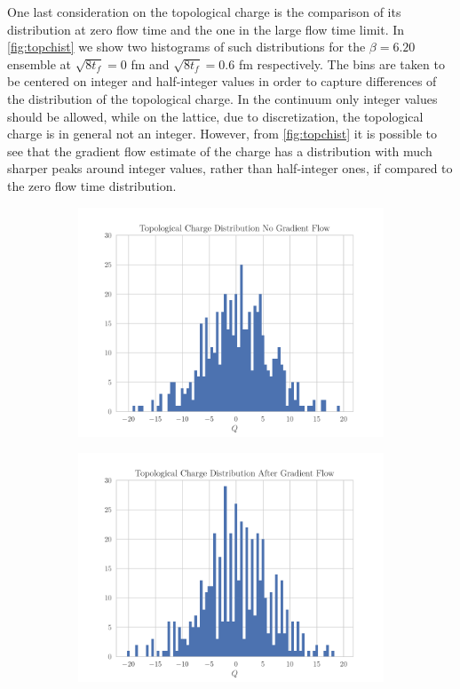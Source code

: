 One last consideration on the topological charge is the comparison of its distribution at zero flow time and the one in the large flow time limit. In \cref{fig:topchist} we show two histograms of such distributions for the $\beta = 6.20$ ensemble at $\sqrt{8t_f} = 0$ fm and $\sqrt{8t_f} = 0.6$ fm respectively. The bins are taken to be centered on integer and half-integer values in order to capture differences of the distribution of the topological charge. In the continuum only integer values should be allowed, while on the lattice, due to discretization, the topological charge is in general not an integer. However, from \cref{fig:topchist} it is possible to see that the gradient flow estimate of the charge has a distribution with much sharper peaks around integer values, rather than half-integer ones, if compared to the zero flow time distribution. 
\begin{figure}[hbt!]
    \centering
    \begin{subfigure}{0.45\textwidth}
        \includegraphics[width=\textwidth]{results/TopcHistNoFlow.pdf}
    \end{subfigure}
    \begin{subfigure}{0.45\textwidth}
        \includegraphics[width=\textwidth]{results/TopcHistFlow.pdf}

\end{subfigure}
\end{figure}
